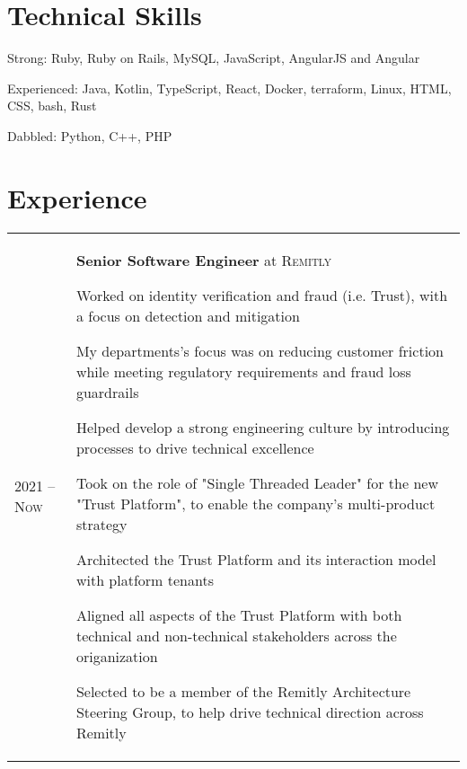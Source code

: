 \documentclass[a4paper,10pt]{article}
\newenvironment{packed-list}{
  \vspace{2pt}
  \begin{itemize}[itemsep=1pt,partopsep=0pt,leftmargin=1.5em]
    \setlength{\parskip}{0pt}
    \setlength{\partopsep}{9pt}
    \setlength{\parsep}{0pt}
    \setlength{\topsep}{0pt}
} {\end{itemize}}
\begin{document}
\section{Technical Skills}
  \begin{packed-list}
    \item{ Strong: Ruby, Ruby on Rails, MySQL, JavaScript, AngularJS and Angular }
    \item{ Experienced: Java, Kotlin, TypeScript, React, Docker, terraform, Linux, HTML, CSS, bash, Rust }
    \item{ Dabbled: Python, C++, PHP }
  \end{packed-list}


\section{Experience}
\begin{tabular}{p{}p{}}
  \textsc{2021 – Now}
    & \textbf{Senior Software Engineer} at \textsc{Remitly}
    \begin{packed-list}
      \item{ Worked on identity verification and fraud (i.e. Trust), with a focus on detection and mitigation }
      \item{ My departments's focus was on reducing customer friction while meeting regulatory requirements and fraud loss guardrails }
      \item{ Helped develop a strong engineering culture by introducing processes to drive technical excellence }
      \item{ Took on the role of "Single Threaded Leader" for the new "Trust Platform", to enable the company's multi-product strategy }
      \item{ Architected the Trust Platform and its interaction model with platform tenants }
      \item{ Aligned all aspects of the Trust Platform with both technical and non-technical stakeholders across the origanization }
      \item{ Selected to be a member of the Remitly Architecture Steering Group, to help drive technical direction across Remitly }
    \end{packed-list}
\end{tabular}
\end{document}
